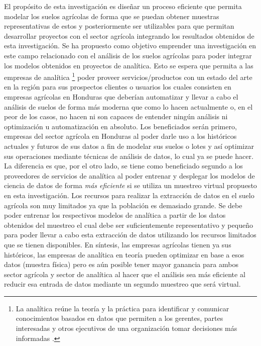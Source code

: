 \documentclass[conference]{IEEEtran}
\begin{document}
El propósito de esta investigación es diseñar un proceso eficiente que permita modelar los suelos agrícolas de forma que se puedan obtener muestras representativas de estos y posteriormente ser utilizables para que permitan desarrollar proyectos con el sector agrícola integrando los resultados obtenidos de esta investigación. Se ha propuesto como objetivo emprender una investigación en este campo relacionado con el análisis de los suelos agrícolas para poder integrar los modelos obtenidos en proyectos de analítica. Esto se espera que permita a las empresas de analítica \footnote{La analítica reúne la teoría y la práctica para identificar y comunicar conocimientos basados en datos que permiten a los gerentes, partes interesadas y otros ejecutivos de una organización tomar decisiones más informadas \cite{eastwood-data-analyst-2021}.} poder proveer servicios/productos con un estado del arte en la región para sus prospectos clientes o usuarios los cuales consisten en empresas agrícolas en Honduras que deberían automatizar y llevar a cabo el análisis de suelos de forma más moderna que como lo hacen actualmente o, en el peor de los casos, no hacen ni son capaces de entender ningún análisis ni optimización u automatización en absoluto. Los beneficiados serán primero, empresas del sector agrícola en Honduras al poder darle uso a los históricos actuales y futuros de sus datos a fin de modelar sus suelos o lotes y así optimizar sus operaciones mediante técnicas de análisis de datos, lo cual ya se puede hacer. La diferencia es que, por el otro lado, se tiene como beneficiado segundo a los proveedores de servicios de analítica al poder entrenar y desplegar los modelos de ciencia de datos de forma \textit{más eficiente} si se utiliza un muestreo virtual propuesto en esta investigación. Los recursos para realizar la extracción de datos en el suelo agrícola son muy limitados ya que la población es demasiado grande. Se debe poder entrenar los respectivos modelos de analítica a partir de los datos obtenidos del muestreo el cual debe ser suficientemente representativo y pequeño para poder llevar a cabo esta extracción de datos utilizando los recursos limitados que se tienen disponibles. En síntesis, las empresas agrícolas tienen ya sus históricos, las empresas de analítica en teoría pueden optimizar en base a esos datos (muestra física) pero es aún posible tener mayor ganancia para ambos sector agrícola y sector de analítica al hacer que el análisis sea más eficiente al reducir esa entrada de datos mediante un segundo muestreo que será virtual.
\end{document}

